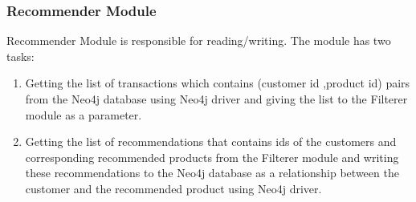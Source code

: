 	\subsubsection{Recommender Module} Recommender Module is responsible for reading/writing. The module has two tasks:
	\begin{enumerate}
		\item Getting the list of transactions which contains (customer id ,product id) pairs from the Neo4j database using Neo4j driver and giving the list to the Filterer module as a parameter.
		\item Getting the list of recommendations that contains ids of the customers and corresponding recommended products from the Filterer module and writing these recommendations to the Neo4j database as a relationship between the customer and the recommended product using Neo4j driver.
	\end{enumerate}